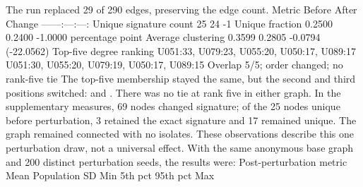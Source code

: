 {}
\markdownRendererSectionEnd \markdownRendererSectionBegin
{}\markdownRendererInterblockSeparator
{}The run replaced 29 of 290 edges, preserving the edge count.\markdownRendererParagraphSeparator
{}\markdownRendererPipe{} Metric \markdownRendererPipe{} Before \markdownRendererPipe{} After \markdownRendererPipe{} Change \markdownRendererPipe{}\markdownRendererSoftLineBreak
{}\markdownRendererPipe{}---\markdownRendererPipe{}---:\markdownRendererPipe{}---:\markdownRendererPipe{}---:\markdownRendererPipe{}\markdownRendererSoftLineBreak
{}\markdownRendererPipe{} Unique signature count \markdownRendererPipe{} 25 \markdownRendererPipe{} 24 \markdownRendererPipe{} -1 \markdownRendererPipe{}\markdownRendererSoftLineBreak
{}\markdownRendererPipe{} Unique fraction \markdownRendererPipe{} 0.2500 \markdownRendererPipe{} 0.2400 \markdownRendererPipe{} -1.0000 percentage point \markdownRendererPipe{}\markdownRendererSoftLineBreak
{}\markdownRendererPipe{} Average clustering \markdownRendererPipe{} 0.3599 \markdownRendererPipe{} 0.2805 \markdownRendererPipe{} -0.0794 (-22.0562\markdownRendererPercentSign{}) \markdownRendererPipe{}\markdownRendererSoftLineBreak
{}\markdownRendererPipe{} Top-five degree ranking \markdownRendererPipe{} U051:33, U079:23, U055:20, U050:17, U089:17 \markdownRendererPipe{} U051:30, U055:20, U079:19, U050:17, U089:15 \markdownRendererPipe{} Overlap 5/5; order changed; no rank-five tie \markdownRendererPipe{}\markdownRendererParagraphSeparator
{}The top-five membership stayed the same, but the second and third positions switched:  and . There was no tie at rank five in either graph. In the supplementary measures, 69 nodes changed signature; of the 25 nodes unique before perturbation, 3 retained the exact signature and 17 remained unique. The graph remained connected with no isolates. These observations describe this one perturbation draw, not a universal effect.\markdownRendererInterblockSeparator
{}
\markdownRendererSectionEnd \markdownRendererSectionBegin
{}\markdownRendererInterblockSeparator
{}With the same anonymous base graph and 200 distinct perturbation seeds, the results were:\markdownRendererParagraphSeparator
{}\markdownRendererPipe{} Post-perturbation metric \markdownRendererPipe{} Mean \markdownRendererPipe{} Population SD \markdownRendererPipe{} Min \markdownRendererPipe{} 5th pct \markdownRendererPipe{} 95th pct \markdownRendererPipe{} Max \markdownRendererPipe{}\markdownRendererSoftLineBreak
